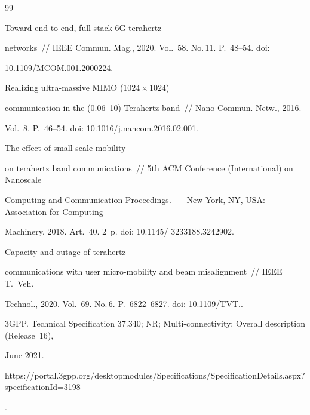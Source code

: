 {\small\frenchspacing


{%




\begin{thebibliography}{99}




 Toward end-to-end, full-stack 6G terahertz 


networks~/\!\!/ IEEE Commun. Mag., 2020. Vol.~58. No.\,11. P.~48--54. doi: 


10.1109\!/\!MCOM.001.2000224.




 Realizing ultra-massive MIMO ($1024\times1024$) 


communication in the (0.06--10) Terahertz band~/\!\!/ Nano Commun. Netw., 2016. 


Vol.~8. P.~46--54. doi: 10.1016\!/\!j.nancom.2016.02.001.




 The effect of small-scale mobility 


on terahertz band communications~/\!\!/ 5th ACM Conference (International) on Nanoscale 


Computing and Communication Proceedings.~--- New York, NY, USA: Association for Computing 


Machinery, 2018. Art.~40. 2~p. doi: 10.1145\!/ 3233188.3242902.




 Capacity and outage of terahertz 


communications with user micro-mobility and beam misalignment~/\!\!/ IEEE T.~Veh. 


Technol., 2020. Vol.~69. No.\,6. P.~6822--6827. doi: 10.1109\!/TVT..




3GPP. Technical Specification 37.340; NR; Multi-connectivity; Overall description (Release~16), 


June 2021. {\sf  


https://portal.3gpp.org/desktopmodules/\linebreak Specifications/SpecificationDetails.aspx?specificationId=3198}.



\end{thebibliography}}}
